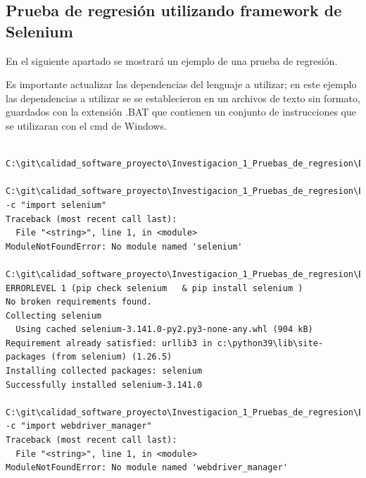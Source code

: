 \documentclass[conference]{IEEEtran}
\begin{document}
\subsection{Prueba de regresión utilizando framework de Selenium}


En el siguiente apartado se mostrará un ejemplo de una prueba de regresión.

Es importante actualizar las dependencias del lenguaje a utilizar; en este ejemplo las dependencias a utilizar se se establecieron en un  archivos de texto sin formato, guardados con la extensión .BAT que contienen un conjunto de instrucciones que se utilizaran con el cmd de Windows.

\begin{lstlisting}[style=CMD]

C:\git\calidad_software_proyecto\Investigacion_1_Pruebas_de_regresion\Ejemplo_Practico>python_dependencies.bat

C:\git\calidad_software_proyecto\Investigacion_1_Pruebas_de_regresion\Ejemplo_Practico>python -c "import selenium"
Traceback (most recent call last):
  File "<string>", line 1, in <module>
ModuleNotFoundError: No module named 'selenium'

C:\git\calidad_software_proyecto\Investigacion_1_Pruebas_de_regresion\Ejemplo_Practico>if ERRORLEVEL 1 (pip check selenium   & pip install selenium )
No broken requirements found.
Collecting selenium
  Using cached selenium-3.141.0-py2.py3-none-any.whl (904 kB)
Requirement already satisfied: urllib3 in c:\python39\lib\site-packages (from selenium) (1.26.5)
Installing collected packages: selenium
Successfully installed selenium-3.141.0

C:\git\calidad_software_proyecto\Investigacion_1_Pruebas_de_regresion\Ejemplo_Practico>python -c "import webdriver_manager"
Traceback (most recent call last):
  File "<string>", line 1, in <module>
ModuleNotFoundError: No module named 'webdriver_manager'


\end{lstlisting}
\end{document}
